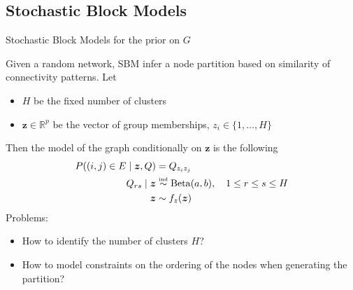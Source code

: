 \subsection{Stochastic Block Models}
\begin{frame}{Stochastic Block Models for the prior on $G$}

Given a random network, SBM \alert{infer a node partition} based on similarity of connectivity patterns. Let
\begin{itemize}
    \item $H$ be the fixed number of clusters
    \item $\bm{z} \in \mathbb{R}^p$ be the vector of group memberships, $z_{i} \in \{1,\ldots,H\}$
\end{itemize} 
Then the model of the graph conditionally on $\bm{z}$ is the following
\begin{align*}
    P((i,j)\in E\mid \bm{z},Q) &= Q_{z_{i} z_{j}}\\
    Q_{rs} \mid \bm{z} &\overset{\text{\tiny{ind}}}{\sim} \operatorname{Beta}(a,b),\quad 1\leq r\leq s\leq H\\
    \bm{z} &\sim f_{z}(\bm{z})
\end{align*}
Problems:
\begin{itemize}
    \pause
    \item {\small How to \alert{identify the number of clusters $H$}?}
    \pause
    \item {\small How to model \alert{constraints on the ordering of the nodes} when generating the partition?}
\end{itemize}


\end{frame}
















